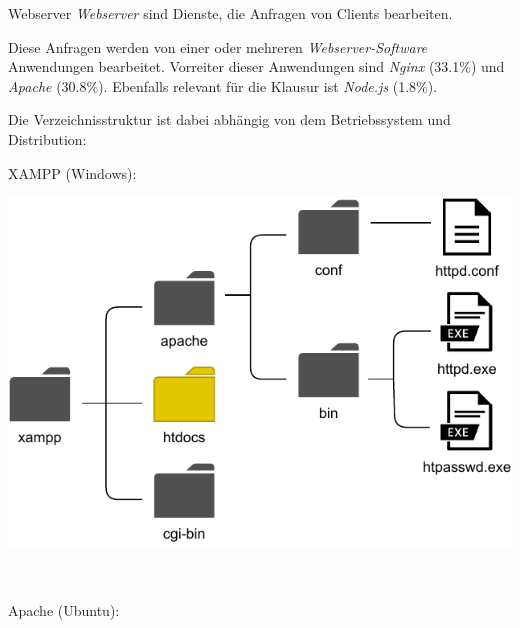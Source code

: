 \begin{defi}{Webserver}
    \emph{Webserver} sind Dienste, die Anfragen von Clients bearbeiten.

    Diese Anfragen werden von einer oder mehreren \emph{Webserver-Software} Anwendungen bearbeitet.
    Vorreiter dieser Anwendungen sind \emph{Nginx} (33.1\%) und \emph{Apache} (30.8\%).
    Ebenfalls relevant für die Klausur ist \emph{Node.js} (1.8\%).

    Die Verzeichnisstruktur ist dabei abhängig von dem Betriebssystem und Distribution:

    \begin{minipage}[t]{0.45\textwidth}
        \begin{center}
            XAMPP (Windows):
        \end{center}

        \includegraphics[width=\textwidth]{includes/figures/defi_xampp.pdf}
    \end{minipage}
    \begin{minipage}{0.1\textwidth}
        \
    \end{minipage}
    \begin{minipage}[t]{0.45\textwidth}
        \begin{center}
            Apache (Ubuntu):
        \end{center}


\end{minipage}
\end{defi}
